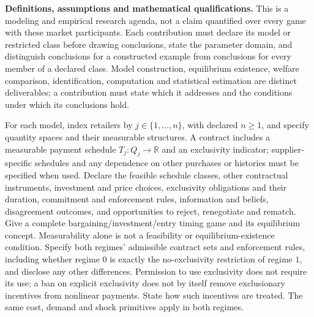 \documentclass[11pt,a4paper]{article}
\newcommand{\R}{\mathbb R}
\begin{document}
\textbf{Definitions, assumptions and mathematical qualifications.} This is a modeling and empirical research agenda, not a claim quantified over every game with these market participants. Each contribution must declare its model or restricted class before drawing conclusions, state the parameter domain, and distinguish conclusions for a constructed example from conclusions for every member of a declared class. Model construction, equilibrium existence, welfare comparison, identification, computation and statistical estimation are distinct deliverables; a contribution must state which it addresses and the conditions under which its conclusions hold.

For each model, index retailers by \(j\in\{1,\ldots,n\}\), with declared \(n\geq1\), and specify quantity spaces and their measurable structures. A contract includes a measurable payment schedule \(T_j:Q_j\to\R\) and an exclusivity indicator; supplier-specific schedules and any dependence on other purchases or histories must be specified when used. Declare the feasible schedule classes, other contractual instruments, investment and price choices, exclusivity obligations and their duration, commitment and enforcement rules, information and beliefs, disagreement outcomes, and opportunities to reject, renegotiate and rematch. Give a complete bargaining/investment/entry timing game and its equilibrium concept. Measurability alone is not a feasibility or equilibrium-existence condition. Specify both regimes' admissible contract sets and enforcement rules, including whether regime \(0\) is exactly the no-exclusivity restriction of regime \(1\), and disclose any other differences. Permission to use exclusivity does not require its use; a ban on explicit exclusivity does not by itself remove exclusionary incentives from nonlinear payments. State how such incentives are treated. The same cost, demand and shock primitives apply in both regimes.
\end{document}
